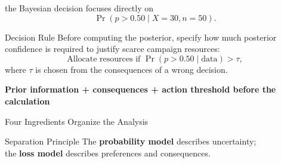 \documentclass[aspectratio=43,11pt]{beamer}
\begin{document}
{\begin{frame}{}
      the Bayesian decision focuses directly on
      \[
      \Pr(p>0.50\mid X=30,n=50).
      \]

      \begin{block}{Decision Rule}
      Before computing the posterior, specify how much posterior confidence
      is required to justify scarce campaign resources:
      \[
      \text{Allocate resources if }
      \Pr(p>0.50\mid \text{data})>\tau,
      \]
      where \(\tau\) is chosen from the consequences of a wrong decision.
      \end{block}

      \centering
      \small
      \textbf{Prior information + consequences + action threshold before the calculation}

  \end{frame}
  }

  \begin{frame}{Four Ingredients Organize the Analysis}
    \begin{center}
    \end{center}
    \begin{block}{Separation Principle}
      The \textbf{probability model} describes uncertainty;\\
      the \textbf{loss model} describes preferences and consequences.
    \end{block}
  \end{frame}
\end{document}
